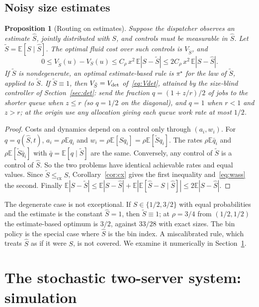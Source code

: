 \documentclass[11pt]{article}
\numberwithin{equation}{section}
\newtheorem{proposition}[theorem]{Proposition}
\theoremstyle{definition}
\theoremstyle{remark}
\newcommand{\E}{\mathbb{E}}
\newcommand{\cx}{\le_{\mathrm{cx}}}
\begin{document}
\subsection{Noisy size estimates}

\begin{proposition}[Routing on estimates]\label{prop:noisy}
Suppose the dispatcher observes an estimate $\hat S$, jointly distributed with $S$, and controls must be measurable in $\hat S$. Let $\tilde S=\E[S\mid\hat S]$. The optimal fluid cost over such controls is $V_{\tilde S}$, and
\[
0\le V_{\tilde S}(u)-V_S(u)\le C_\rho\,x^2\,\E|S-\tilde S|\le 2C_\rho\,x^2\,\E|S-\hat S| .
\]
If $\tilde S$ is nondegenerate, an optimal estimate-based rule is $\pi^\star$ for the law of $\tilde S$, applied to $\tilde S$. If $\tilde S\equiv1$, then $V_{\tilde S}=V_{\rm det}$ of~\eqref{eq:Vdet}, attained by the size-blind controller of Section~\ref{sec:det}: send the fraction $q=(1+z/r)/2$ of jobs to the shorter queue when $z\le r$ (so $q=1/2$ on the diagonal), and $q=1$ when $r<1$ and $z>r$; at the origin use any allocation giving each queue work rate at most $1/2$.
\end{proposition}

\begin{proof}
Costs and dynamics depend on a control only through $(a_i,w_i)$. For $q=q(\hat S,t)$, $a_i=\rho\E q_i$ and $w_i=\rho\E[Sq_i]=\rho\E[\tilde Sq_i]$. The rates $\rho\E\bar q_i$ and $\rho\E[\tilde S\bar q_i]$ with $\bar q=\E[q\mid\tilde S]$ are the same. Conversely, any control of $\tilde S$ is a control of $\hat S$. So the two problems have identical achievable rates and equal values. Since $\tilde S\cx S$, Corollary~\ref{cor:cx} gives the first inequality and~\eqref{eq:wass} the second. Finally $\E|S-\tilde S|\le\E|S-\hat S|+\E|\E[\hat S-S\mid\hat S]|\le2\E|S-\hat S|$.
\end{proof}

The degenerate case is not exceptional. If $S\in\{1/2,3/2\}$ with equal probabilities and the estimate is the constant $\hat S=1$, then $\tilde S\equiv1$; at $\rho=3/4$ from $(1/2,1/2)$ the estimate-based optimum is $3/2$, against $33/28$ with exact sizes. The bin policy is the special case where $\hat S$ is the bin index. A miscalibrated rule, which treats $\hat S$ as if it were $S$, is not covered. We examine it numerically in Section~\ref{sec:sim}.

\section{The stochastic two-server system: simulation}\label{sec:sim}
\end{document}
